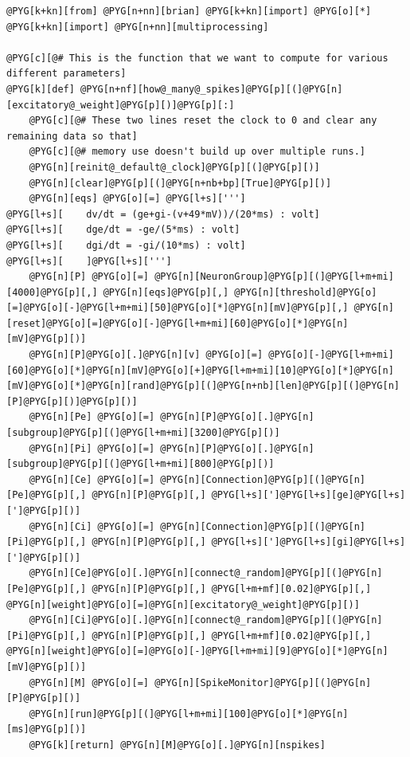 \documentclass[letterpaper,10pt,english]{manual}
\begin{document}
\begin{Verbatim}[commandchars=@\[\]]
@PYG[k+kn][from] @PYG[n+nn][brian] @PYG[k+kn][import] @PYG[o][*]
@PYG[k+kn][import] @PYG[n+nn][multiprocessing]

@PYG[c][@# This is the function that we want to compute for various different parameters]
@PYG[k][def] @PYG[n+nf][how@_many@_spikes]@PYG[p][(]@PYG[n][excitatory@_weight]@PYG[p][)]@PYG[p][:]
    @PYG[c][@# These two lines reset the clock to 0 and clear any remaining data so that]
    @PYG[c][@# memory use doesn't build up over multiple runs.]
    @PYG[n][reinit@_default@_clock]@PYG[p][(]@PYG[p][)]
    @PYG[n][clear]@PYG[p][(]@PYG[n+nb+bp][True]@PYG[p][)]
    @PYG[n][eqs] @PYG[o][=] @PYG[l+s][''']
@PYG[l+s][    dv/dt = (ge+gi-(v+49*mV))/(20*ms) : volt]
@PYG[l+s][    dge/dt = -ge/(5*ms) : volt]
@PYG[l+s][    dgi/dt = -gi/(10*ms) : volt]
@PYG[l+s][    ]@PYG[l+s][''']
    @PYG[n][P] @PYG[o][=] @PYG[n][NeuronGroup]@PYG[p][(]@PYG[l+m+mi][4000]@PYG[p][,] @PYG[n][eqs]@PYG[p][,] @PYG[n][threshold]@PYG[o][=]@PYG[o][-]@PYG[l+m+mi][50]@PYG[o][*]@PYG[n][mV]@PYG[p][,] @PYG[n][reset]@PYG[o][=]@PYG[o][-]@PYG[l+m+mi][60]@PYG[o][*]@PYG[n][mV]@PYG[p][)]
    @PYG[n][P]@PYG[o][.]@PYG[n][v] @PYG[o][=] @PYG[o][-]@PYG[l+m+mi][60]@PYG[o][*]@PYG[n][mV]@PYG[o][+]@PYG[l+m+mi][10]@PYG[o][*]@PYG[n][mV]@PYG[o][*]@PYG[n][rand]@PYG[p][(]@PYG[n+nb][len]@PYG[p][(]@PYG[n][P]@PYG[p][)]@PYG[p][)]
    @PYG[n][Pe] @PYG[o][=] @PYG[n][P]@PYG[o][.]@PYG[n][subgroup]@PYG[p][(]@PYG[l+m+mi][3200]@PYG[p][)]
    @PYG[n][Pi] @PYG[o][=] @PYG[n][P]@PYG[o][.]@PYG[n][subgroup]@PYG[p][(]@PYG[l+m+mi][800]@PYG[p][)]
    @PYG[n][Ce] @PYG[o][=] @PYG[n][Connection]@PYG[p][(]@PYG[n][Pe]@PYG[p][,] @PYG[n][P]@PYG[p][,] @PYG[l+s][']@PYG[l+s][ge]@PYG[l+s][']@PYG[p][)]
    @PYG[n][Ci] @PYG[o][=] @PYG[n][Connection]@PYG[p][(]@PYG[n][Pi]@PYG[p][,] @PYG[n][P]@PYG[p][,] @PYG[l+s][']@PYG[l+s][gi]@PYG[l+s][']@PYG[p][)]
    @PYG[n][Ce]@PYG[o][.]@PYG[n][connect@_random]@PYG[p][(]@PYG[n][Pe]@PYG[p][,] @PYG[n][P]@PYG[p][,] @PYG[l+m+mf][0.02]@PYG[p][,] @PYG[n][weight]@PYG[o][=]@PYG[n][excitatory@_weight]@PYG[p][)]
    @PYG[n][Ci]@PYG[o][.]@PYG[n][connect@_random]@PYG[p][(]@PYG[n][Pi]@PYG[p][,] @PYG[n][P]@PYG[p][,] @PYG[l+m+mf][0.02]@PYG[p][,] @PYG[n][weight]@PYG[o][=]@PYG[o][-]@PYG[l+m+mi][9]@PYG[o][*]@PYG[n][mV]@PYG[p][)]
    @PYG[n][M] @PYG[o][=] @PYG[n][SpikeMonitor]@PYG[p][(]@PYG[n][P]@PYG[p][)]
    @PYG[n][run]@PYG[p][(]@PYG[l+m+mi][100]@PYG[o][*]@PYG[n][ms]@PYG[p][)]
    @PYG[k][return] @PYG[n][M]@PYG[o][.]@PYG[n][nspikes]


\end{Verbatim}
\end{document}
